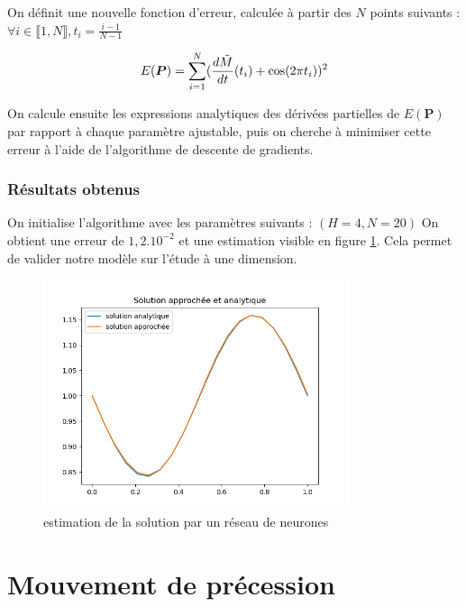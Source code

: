 \documentclass[12pt]{report}
\begin{document}
On définit une nouvelle fonction d'erreur, calculée à partir des $N$ points suivants : $\forall i \in\llbracket 1,N \rrbracket, t_i = \frac{i-1}{N-1} $

\begin{equation}
    E(\bm{P}) = \sum_{i=1}^{N} (\frac{d\Tilde{M}}{dt}(t_i) + \cos(2\pi t_i))^2
    \label{eq:erreur_NN}
\end{equation}


On calcule ensuite les expressions analytiques des dérivées partielles de $E(\bm{P})$ par rapport à chaque paramètre ajustable, puis on cherche à minimiser cette erreur à l'aide de l'algorithme de descente de gradients.

\subsection{Résultats obtenus}

On initialise l'algorithme avec les paramètres suivants : $(H=4, N=20)$
On obtient une erreur de $1,2.10^{-2}$ et une estimation visible en figure \ref{fig:resultat_NN}.
Cela permet de valider notre modèle sur l'étude à une dimension.

\begin{figure}
    \centering
    \includegraphics[width=0.8\textwidth]{resultat_NN.png}
    \caption{estimation de la solution par un réseau de neurones}
    \label{fig:resultat_NN}
\end{figure}

\chapter{Mouvement de précession}
\label{chap:precession}
\end{document}
